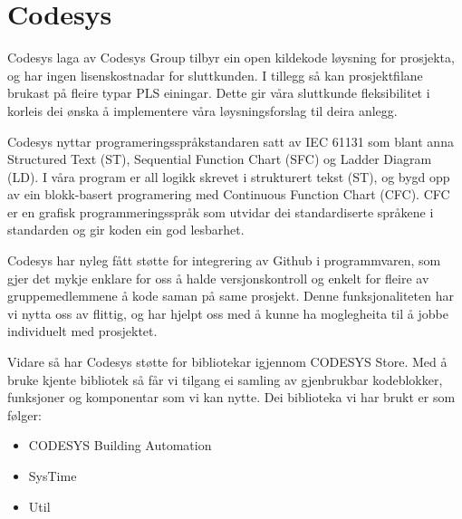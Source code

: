 \section{Codesys}
\thispagestyle{fancy}
Codesys\citep{Codesys} laga av Codesys Group tilbyr ein open kildekode løysning for prosjekta, og har ingen lisenskostnadar for sluttkunden. 
I tillegg så kan prosjektfilane brukast på fleire typar PLS einingar. 
Dette gir våra sluttkunde fleksibilitet i korleis dei ønska å implementere våra løysningsforslag til deira anlegg.

Codesys nyttar programeringsspråkstandaren satt av IEC 61131 som blant anna Structured Text (ST), Sequential Function Chart (SFC) og Ladder Diagram (LD). I våra program er all logikk skrevet i strukturert tekst (ST), og bygd opp av ein blokk-basert programering med Continuous Function Chart (CFC). 
CFC er en grafisk programmeringsspråk som utvidar dei standardiserte språkene i standarden og gir koden ein god lesbarhet.

Codesys har nyleg fått støtte for integrering av Github i programmvaren, som gjer det mykje enklare for oss å halde versjonskontroll og enkelt for fleire av gruppemedlemmene å kode saman på same prosjekt. 
Denne funksjonaliteten har vi nytta oss av flittig, og har hjelpt oss med å kunne ha moglegheita til å jobbe individuelt med prosjektet.

Vidare så har Codesys støtte for bibliotekar igjennom CODESYS Store. 
Med å bruke kjente bibliotek så får vi tilgang ei samling av gjenbrukbar kodeblokker, funksjoner og komponentar som vi kan nytte.
Dei biblioteka vi har brukt er som følger:

\begin{itemize}
    \item CODESYS Building Automation \citep{BuildingAutomation}
    \item SysTime \citep{DateAndTime}
    \item Util \citep{DateAndTime}
\end{itemize}

\newpage


